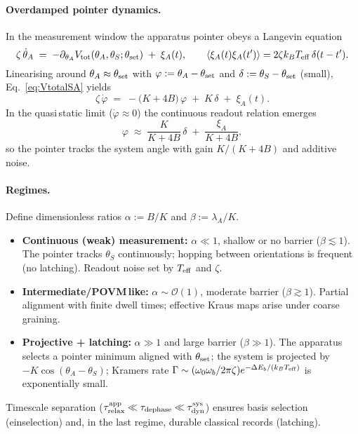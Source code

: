 \documentclass[11pt]{article}
\begin{document}
\paragraph{Overdamped pointer dynamics.} In the measurement window the apparatus pointer obeys a Langevin equation
\begin{equation}
  \zeta\,\dot\theta_A \;=\; -\partial_{\theta_A} V_{\rm tot}(\theta_A,\theta_S;\theta_{\rm set}) \; +\; \xi_A(t),\qquad \langle\xi_A(t)\xi_A(t')\rangle=2\zeta k_B T_{\rm eff}\,\delta(t-t').
\end{equation}
Linearising around $\theta_A\approx\theta_{\rm set}$ with $\varphi:=\theta_A-\theta_{\rm set}$ and $\delta:=\theta_S-\theta_{\rm set}$ (small), Eq.~\eqref{eq:VtotalSA} yields
\begin{equation}
  \zeta\,\dot\varphi \;=\; -\big(K+4B\big)\,\varphi \; +\; K\,\delta \; +\; \xi_A(t).
\end{equation}
In the quasi\,static limit ($\dot\varphi\approx0$) the continuous readout relation emerges
\begin{equation}
  \varphi \;\approx\; \frac{K}{K+4B}\,\delta \; +\; \frac{\xi_A}{K+4B},
\end{equation}
so the pointer tracks the system angle with gain $K/(K+4B)$ and additive noise.

\paragraph{Regimes.} Define dimensionless ratios $\alpha:=B/K$ and $\beta:=\lambda_A/K$.
\begin{itemize}
  \item \textbf{Continuous (weak) measurement:} $\alpha\ll1$, shallow or no barrier ($\beta\lesssim1$). The pointer tracks $\theta_S$ continuously; hopping between orientations is frequent (no latching). Readout noise set by $T_{\rm eff}$ and $\zeta$.
  \item \textbf{Intermediate/POVM\,like:} $\alpha\sim\mathcal O(1)$, moderate barrier ($\beta\gtrsim1$). Partial alignment with finite dwell times; effective Kraus maps arise under coarse\,graining.
  \item \textbf{Projective + latching:} $\alpha\gg1$ and large barrier ($\beta\gg1$). The apparatus selects a pointer minimum aligned with $\theta_{\rm set}$; the system is projected by $-K\cos(\theta_A-\theta_S)$; Kramers rate $\Gamma\sim(\omega_0\omega_b/2\pi\zeta) e^{-\Delta E_b/(k_B T_{\rm eff})}$ is exponentially small.
\end{itemize}
Timescale separation ($\tau_{\rm relax}^{\rm app}\ll\tau_{\rm dephase}\ll\tau_{\rm dyn}^{\rm sys}$) ensures basis selection (einselection) and, in the last regime, durable classical records (latching).
\end{document}
